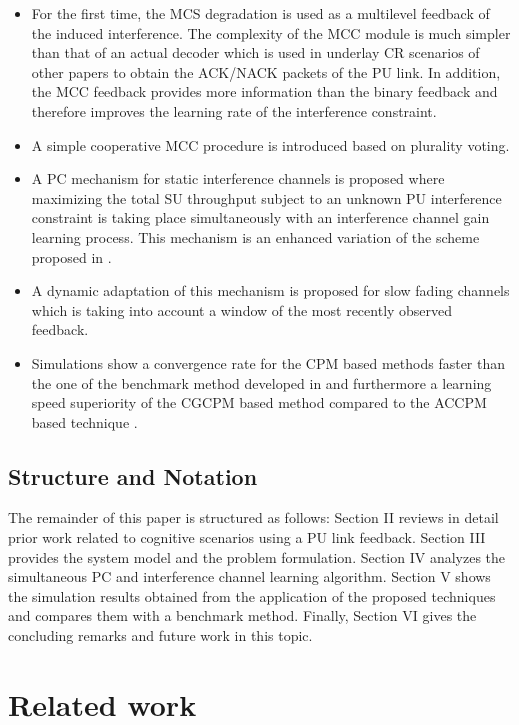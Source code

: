 \documentclass[journal]{IEEEtran}
\begin{document}
\begin{itemize}

  \item For the first time, the MCS degradation is used as a multilevel feedback of the induced interference. The complexity of the MCC module is much simpler than that of an actual decoder which is used in underlay CR scenarios of other papers to obtain the ACK/NACK packets of the PU link. In addition, the MCC feedback provides more information than the binary feedback and therefore improves the learning rate of the interference constraint.
  \item A simple cooperative MCC procedure is introduced based on plurality voting.
  \item A PC mechanism for static interference channels is proposed where maximizing the total SU throughput subject to an unknown PU interference constraint is taking place simultaneously with an interference channel gain learning process. This mechanism is an enhanced variation of the scheme proposed in \cite{biban73}.
  \item A dynamic adaptation of this mechanism is proposed for slow fading channels which is taking into account a window of the most recently observed feedback.
  \item Simulations show a convergence rate for the CPM based methods faster than the one of the benchmark method developed in \cite{biban80} and furthermore a learning speed superiority of the CGCPM based method compared to the ACCPM based technique \cite{biban73}.

\end{itemize}

\subsection{Structure and Notation} 

The remainder of this paper is structured as follows: Section II reviews in detail
prior work related to cognitive scenarios using a PU link feedback. Section III provides the system model and the problem formulation. Section IV analyzes the simultaneous PC and interference channel learning algorithm. Section V shows the simulation results obtained from the application of the proposed techniques and compares them with a benchmark method. Finally, Section VI gives the concluding remarks and future work in this topic.


\section{Related work}
\end{document}
